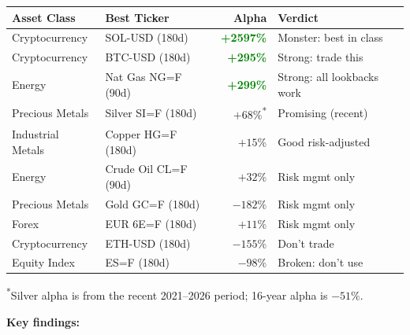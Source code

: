 \documentclass[11pt,a4paper]{article}
\begin{document}
\vspace{0.5em}
\begin{tabular}{@{}llrl@{}}
    \toprule
    \textbf{Asset Class} & \textbf{Best Ticker} & \textbf{Alpha} & \textbf{Verdict} \\
    \midrule
    Cryptocurrency   & SOL-USD (180d)  & \textcolor{green}{\textbf{+2597\%}} & Monster: best in class \\
    Cryptocurrency   & BTC-USD (180d)  & \textcolor{green}{\textbf{+295\%}}  & Strong: trade this \\
    Energy           & Nat Gas NG=F (90d) & \textcolor{green}{\textbf{+299\%}} & Strong: all lookbacks work \\
    Precious Metals  & Silver SI=F (180d) & $+68\%$\textsuperscript{*} & Promising (recent) \\
    Industrial Metals& Copper HG=F (180d) & $+15\%$  & Good risk-adjusted \\
    Energy           & Crude Oil CL=F (90d) & $+32\%$ & Risk mgmt only \\
    Precious Metals  & Gold GC=F (180d) & $-182\%$  & Risk mgmt only \\
    Forex            & EUR 6E=F (180d)  & $+11\%$   & Risk mgmt only \\
    Cryptocurrency   & ETH-USD (180d)   & $-155\%$  & Don't trade \\
    Equity Index     & ES=F (180d)      & $-98\%$   & Broken: don't use \\
    \bottomrule
\end{tabular}

\vspace{0.3em}
{\small \textsuperscript{*}Silver alpha is from the recent 2021--2026 period; 16-year alpha is $-51\%$.}

\vspace{0.5em}
\textbf{Key findings:}
\end{document}
